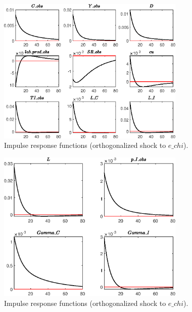 \begin{figure}[H]
\centering 
\includegraphics[width=0.80\textwidth]{directed_search/graphs/directed_search_IRF_e_chi1}
\caption{Impulse response functions (orthogonalized shock to $e\_chi$).}\label{Fig:IRF:e_chi:1}
\end{figure}
 
\begin{figure}[H]
\centering 
\includegraphics[width=0.80\textwidth]{directed_search/graphs/directed_search_IRF_e_chi2}
\caption{Impulse response functions (orthogonalized shock to $e\_chi$).}\label{Fig:IRF:e_chi:2}
\end{figure}
 
 
